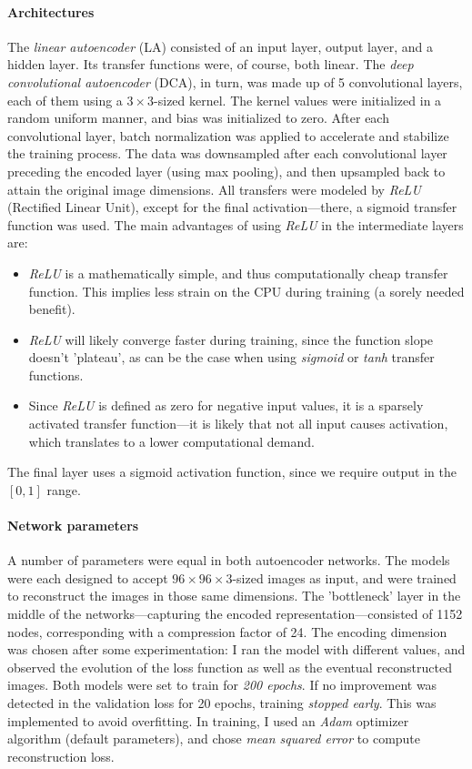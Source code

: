 \paragraph{Architectures} The \textit{linear autoencoder} (LA) consisted of an input layer, output layer, and a hidden layer. Its transfer functions were, of course, both linear. The \textit{deep convolutional autoencoder} (DCA), in turn, was made up of 5 convolutional layers, each of them using a $3 \times 3$-sized kernel. The kernel values were initialized in a random uniform manner, and bias was initialized to zero. After each convolutional layer, batch normalization was applied to accelerate and stabilize the training process. The data was downsampled after each convolutional layer preceding the encoded layer (using max pooling), and then upsampled back to attain the original image dimensions. All transfers were modeled by \textit{ReLU} (Rectified Linear Unit), except for the final activation---there, a sigmoid transfer function was used. The main advantages of using \textit{ReLU} in the intermediate layers are:

\begin{itemize}

	\item{\textit{ReLU} is a mathematically simple, and thus computationally cheap transfer function. This implies less strain on the CPU during training (a sorely needed benefit).}
	\item{\textit{ReLU} will likely converge faster during training, since the function slope doesn't 'plateau', as can be the case when using \textit{sigmoid} or \textit{tanh} transfer functions.}
	\item{Since \textit{ReLU} is defined as zero for negative input values, it is a sparsely activated transfer function---it is likely that not all input causes activation, which translates to a lower computational demand.}

\end{itemize}

The final layer uses a sigmoid activation function, since we require output in the $[0, 1]$ range.

\paragraph{Network parameters} A number of parameters were equal in both autoencoder networks. The models were each designed to accept $96\times96\times3$-sized images as input, and were trained to reconstruct the images in those same dimensions. The 'bottleneck' layer in the middle of the networks---capturing the encoded representation---consisted of 1152 nodes, corresponding with a compression factor of 24. The encoding dimension was chosen after some experimentation: I ran the model with different values, and observed the evolution of the loss function as well as the eventual reconstructed images. Both models were set to train for \textit{200 epochs}. If no improvement was detected in the validation loss for 20 epochs, training \textit{stopped early}. This was implemented to avoid overfitting. In training, I used an \textit{Adam} optimizer algorithm (default parameters), and chose \textit{mean squared error} to compute reconstruction loss. 

